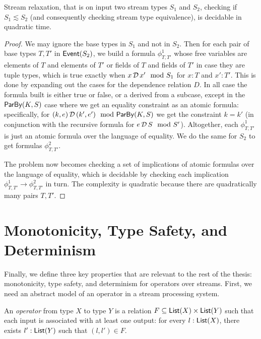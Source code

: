 \begin{theorem}
\label{thm:stream-relaxation-decidable}
Stream relaxation, that is on input two stream types $S_1$ and $S_2$, checking if $S_1 \lesssim S_2$ (and consequently checking stream type equivalence), is decidable in quadratic time.
\end{theorem}
\begin{proof}
We may ignore the base types in $S_1$ and not in $S_2$.
Then for each pair of base types $T, T'$ in $\mathsf{Event}(S_2)$,
we build a formula $\phi^1_{T, T'}$ whose free variables are elements of $T$ and elements of $T'$ or fields of $T$ and fields of $T'$ in case they are tuple types,
which is true exactly when
$x \,\mathcal{D}\, x' \mod {S_1}$ for $x : T$ and $x' : T'$.
This is done by expanding out the cases for the dependence relation $D$.
In all case the formula built is either true or false, or a derived from a subcase,
except in the $\mathsf{ParBy}({K}, S)$ case where
we get an equality constraint as an atomic formula:
specifically, for $(k, e) \,\mathcal{D}\, (k', e') \mod {\mathsf{ParBy}({K}, S)}$
we get the constraint $k = k'$ (in conjunction with the recursive formula for $e \,\mathcal{D}\, S \mod {S'}$).
Altogether, each $\phi^1_{T, T'}$ is just an atomic formula over the
language of equality.
We do the same for $S_2$ to get formulas $\phi^2_{T, T'}$.

The problem now becomes checking a set of implications
of atomic formulas over the language of equality, which is
decidable by checking each implication
$\phi^1_{T, T'} \to \phi^2_{T, T'}$
in turn.
The complexity is quadratic because there are quadratically many pairs $T, T'$.
\end{proof}

\section{Monotonicity, Type Safety, and Determinism}

Finally, we define three key properties that are relevant to the rest of the thesis: monotonicity, type safety, and determinism for operators over streams.
First, we need an abstract model of an operator in a stream processing system.
\begin{definition}
An \emph{operator} from type $X$ to type $Y$ is a relation
$F \subseteq \mathsf{List}(X) \times \mathsf{List}(Y)$ such that each input is associated with at least one output:
for every $l: \mathsf{List}(X)$, there exists $l': \mathsf{List}(Y)$
such that $(l, l') \in F$.
\end{definition}

